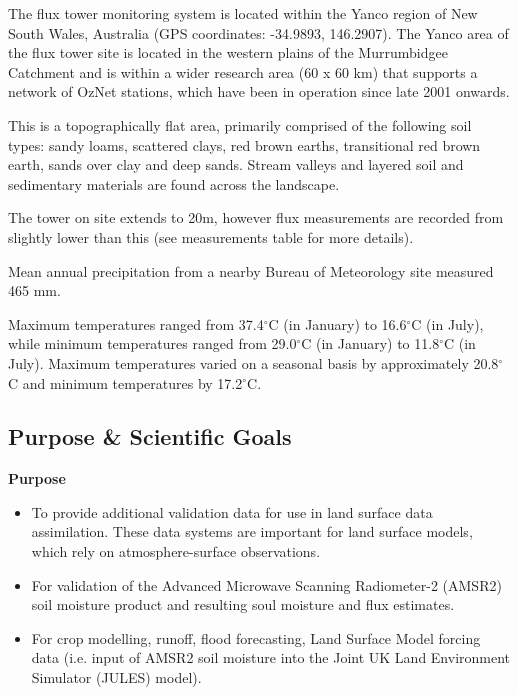 \documentclass[11pt,a4paper]{article}
\begin{document}
The flux tower monitoring system is located within the Yanco region of New South Wales, Australia (GPS coordinates: -34.9893, 146.2907). The Yanco area of the flux tower site is located in the western plains of the Murrumbidgee Catchment and is within a wider research area (60 x 60 km) that supports a network of OzNet stations, which have been in operation since late 2001 onwards.

This is a topographically flat area, primarily comprised of the following soil types: sandy loams, scattered clays, red brown earths, transitional red brown earth, sands over clay and deep sands. Stream valleys and layered soil and sedimentary materials are found across the landscape.

The tower on site extends to 20m, however flux measurements are recorded from slightly lower than this (see measurements table for more details).

Mean annual precipitation from a nearby Bureau of Meteorology site measured 465 mm.

Maximum temperatures ranged from 37.4$^\circ$C (in January) to 16.6$^\circ$C (in July), while minimum temperatures ranged from 29.0$^\circ$C (in January) to 11.8$^\circ$C (in July). Maximum temperatures varied on a seasonal basis by approximately 20.8$^\circ$C and minimum temperatures by 17.2$^\circ$C.

\subsection*{Purpose \& Scientific Goals}

\textbf{Purpose}

\begin{itemize}
  \item To provide additional       validation data for use in land surface data assimilation. These data systems are important for land surface       models, which rely on atmosphere-surface observations.
  \item For validation of       the Advanced Microwave Scanning Radiometer-2 (AMSR2) soil moisture product       and resulting soul moisture and flux estimates.
\end{itemize}

\begin{itemize}
  \item For crop modelling, runoff, flood forecasting, Land  Surface Model forcing data (i.e. input of AMSR2 soil moisture into the Joint UK  Land Environment Simulator (JULES) model).
\end{itemize}
\end{document}
